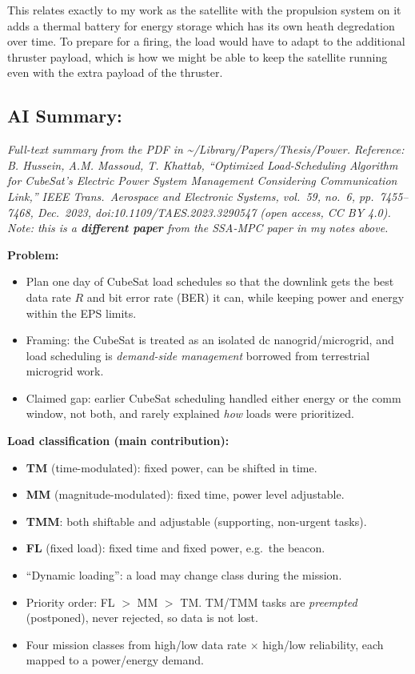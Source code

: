 \documentclass[11pt]{article}
\begin{document}
This relates exactly to my work as the satellite with the propulsion system on it adds a thermal battery for energy storage which has its own heath degredation over time. To prepare for a firing, the load would have to adapt to the additional thruster payload, which is how we might be able to keep the satellite running even with the extra payload of the thruster.

\subsection{AI Summary:}

\textit{Full-text summary from the PDF in \textasciitilde/Library/Papers/Thesis/Power. Reference: B. Hussein, A.M. Massoud, T. Khattab, ``Optimized Load-Scheduling Algorithm for CubeSat's Electric Power System Management Considering Communication Link,'' IEEE Trans.\ Aerospace and Electronic Systems, vol.\ 59, no.\ 6, pp.\ 7455--7468, Dec.\ 2023, doi:10.1109/TAES.2023.3290547 (open access, CC BY 4.0). Note: this is a \textbf{different paper} from the SSA-MPC paper in my notes above.}

\textbf{Problem:}
\begin{itemize}[noitemsep]
    \item Plan one day of CubeSat load schedules so that the downlink gets the best data rate $R$ and bit error rate (BER) it can, while keeping power and energy within the EPS limits.
    \item Framing: the CubeSat is treated as an isolated dc nanogrid/microgrid, and load scheduling is \textit{demand-side management} borrowed from terrestrial microgrid work.
    \item Claimed gap: earlier CubeSat scheduling handled either energy or the comm window, not both, and rarely explained \textit{how} loads were prioritized.
\end{itemize}

\textbf{Load classification (main contribution):}
\begin{itemize}[noitemsep]
    \item \textbf{TM} (time-modulated): fixed power, can be shifted in time.
    \item \textbf{MM} (magnitude-modulated): fixed time, power level adjustable.
    \item \textbf{TMM}: both shiftable and adjustable (supporting, non-urgent tasks).
    \item \textbf{FL} (fixed load): fixed time and fixed power, e.g.\ the beacon.
    \item ``Dynamic loading'': a load may change class during the mission.
    \item Priority order: FL $>$ MM $>$ TM. TM/TMM tasks are \textit{preempted} (postponed), never rejected, so data is not lost.
    \item Four mission classes from high/low data rate $\times$ high/low reliability, each mapped to a power/energy demand.
\end{itemize}
\end{document}
